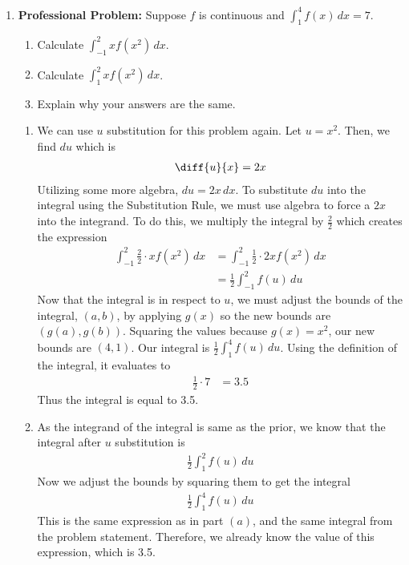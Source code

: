 \documentclass{article}
\begin{document}
\begin{enumerate}[label=\textbf{(3.\arabic*)}]
\newpage %

\item \textbf{Professional Problem:} Suppose $f$ is continuous and $\displaystyle{ \int_1^4\!f(x)\,dx=7}$.
\begin{enumerate}[label=(\alph*)]
\item Calculate $\int_{-1}^2\!xf(x^2)\,dx$.
\item Calculate $\int_1^2\!xf(x^2)\,dx$.
\item Explain why your answers are the same.
\end{enumerate}

\begin{enumerate}[label=(\alph*)]
\item We can use $u$ substitution for this  problem again. Let $u=x^2$. Then, we find $du$ which is
\begin{align*}
\diff{u}{x}&=2x \\
\end{align*}
Utilizing some more algebra, $du = 2x\,dx$. To substitute $du$ into the integral using the Substitution Rule, we must use algebra to force a $2x$ into the integrand. To do this, we multiply the integral by $\frac{2}{2}$ which creates the expression
\begin{align*}
\int_{-1}^2\!\frac{2}{2}\cdot xf\left(x^2\right)\,dx &= \int_{-1}^2\!\frac{1}{2}\cdot2xf\left(x^2\right)\,dx \\
&= \frac{1}{2}\int_{-1}^2\!f\left(u\right)\,du
\end{align*}
Now that the integral is in respect to $u$, we must adjust the bounds of the integral, $(a,b)$, by applying $g(x)$ so the new bounds are $\left(g(a),g(b)\right)$. Squaring the values because $g(x)=x^2$, our new bounds are $(4,1)$. Our integral is $\frac{1}{2}\int_1^4\!f(u)\,du$. Using the definition of the integral, it evaluates to
\begin{align*}
\frac{1}{2}\cdot7&=3.5
\end{align*}
Thus the integral is equal to 3.5.

\item As the integrand of the integral is same as the prior, we know that the integral after $u$ substitution is 
\begin{align*}
\frac{1}{2}\int_1^2\!f(u)\,du
\end{align*}
Now we adjust the bounds by squaring them to get the integral
\begin{align*}
\frac{1}{2}\int_1^4\!f(u)\,du
\end{align*}
This is the same expression as in part $(a)$, and the same integral from the problem statement. Therefore, we already know the value of this expression, which is 3.5.


\end{enumerate}
\end{enumerate}
\end{document}
